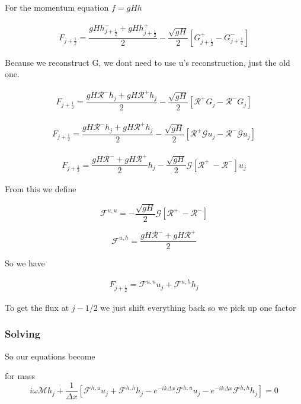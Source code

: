 \documentclass[12pt]{article}
\begin{document}
For the momentum equation $f = gHh$

\begin{multline}
F_{j+\frac{1}{2}} = \dfrac{ gHh^-_{j+\frac{1}{2}} + gHh^+_{j+\frac{1}{2}}}{ 2}  - \dfrac{ \sqrt{gH}}{ 2} \left [ G^+_{j+\frac{1}{2}} - G^-_{j+\frac{1}{2}} \right ]
\end{multline}

Because we reconstruct G, we dont need to use u's reconstruction, just the old one.

\begin{multline}
F_{j+\frac{1}{2}} = \dfrac{ gH \mathcal{R}^-h_{j} + gH \mathcal{R}^+h_{j}}{ 2}  - \dfrac{ \sqrt{gH}}{ 2} \left [ \mathcal{R}^+G_{j} -  \mathcal{R}^-G_{j} \right ]
\end{multline}

\begin{multline}
F_{j+\frac{1}{2}} = \dfrac{ gH \mathcal{R}^-h_{j} + gH \mathcal{R}^+h_{j}}{ 2}  - \dfrac{ \sqrt{gH}}{ 2} \left [ \mathcal{R}^+ \mathcal{G}u_{j} -  \mathcal{R}^- \mathcal{G}u_{j} \right ]
\end{multline}

\begin{multline}
F_{j+\frac{1}{2}} = \dfrac{ gH \mathcal{R}^- + gH \mathcal{R}^+}{ 2} h_j  - \dfrac{ \sqrt{gH}}{ 2} \mathcal{G} \left [ \mathcal{R}^+ \ -  \mathcal{R}^-  \right ] u_{j}
\end{multline}

From this we define

\[\mathcal{F}^{u,u} = - \dfrac{ \sqrt{gH}}{ 2} \mathcal{G} \left [ \mathcal{R}^+ \ -  \mathcal{R}^-  \right ]\]

\[\mathcal{F}^{u,h} = \dfrac{ gH \mathcal{R}^- + gH \mathcal{R}^+}{ 2}\]

So we have 

\begin{multline}
F_{j+\frac{1}{2}} = \mathcal{F}^{u,u}u_{j}  + \mathcal{F}^{u,h} h_{j}
\end{multline}

To get the flux at $j -1/2$ we just shift everything back so we pick up one factor

\subsubsection{Solving}

So our equations become 

for mass
\[i\omega \mathcal{M}h_j + \frac{1}{\Delta x}\left[\mathcal{F}^{h,u}u_{j}  + \mathcal{F}^{h,h} h_{j} - e^{-ik\Delta x}\mathcal{F}^{h,u}u_{j}  - e^{-ik\Delta x}\mathcal{F}^{h,h} h_{j}\right] = 0 \]
\end{document}
